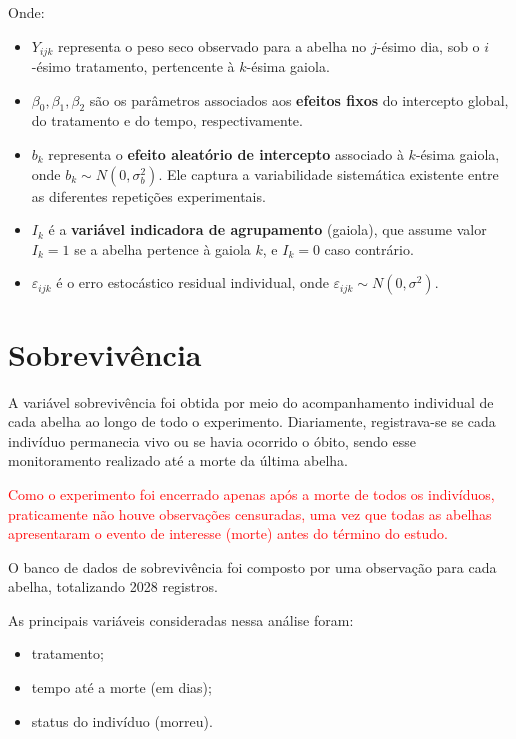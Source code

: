 \documentclass[
  brazilian,
  12pt,
  a4paper,
]{article}
\begin{document}
Onde:

\begin{itemize}
    \item $Y_{ijk}$ representa o peso seco observado para a abelha no $j$-ésimo dia, sob o $i$-ésimo tratamento, pertencente à $k$-ésima gaiola.
    \item $\beta_0, \beta_1, \beta_2$ são os parâmetros associados aos \textbf{efeitos fixos} do intercepto global, do tratamento e do tempo, respectivamente.
    \item $b_k$ representa o \textbf{efeito aleatório de intercepto} associado à $k$-ésima gaiola, onde $b_k \sim N(0, \sigma^2_b)$. Ele captura a variabilidade sistemática existente entre as diferentes repetições experimentais.
    \item $I_k$ é a \textbf{variável indicadora de agrupamento} (gaiola), que assume valor $I_k = 1$ se a abelha pertence à gaiola $k$, e $I_k = 0$ caso contrário.
    \item $\varepsilon_{ijk}$ é o erro estocástico residual individual, onde $\varepsilon_{ijk} \sim N(0, \sigma^2)$.
\end{itemize}

\section{Sobrevivência}\label{sobrevivuxeancia}

A variável sobrevivência foi obtida por meio do acompanhamento
individual de cada abelha ao longo de todo o experimento. Diariamente,
registrava-se se cada indivíduo permanecia vivo ou se havia ocorrido o
óbito, sendo esse monitoramento realizado até a morte da última abelha.

\textcolor{red}{Como o experimento foi encerrado apenas após a morte de todos os indivíduos, praticamente não houve observações censuradas, uma vez que todas as abelhas apresentaram o evento de interesse (morte) antes do término do estudo.}

O banco de dados de sobrevivência foi composto por uma observação para
cada abelha, totalizando 2028 registros.

As principais variáveis consideradas nessa análise foram:

\begin{itemize}
    \item tratamento;
    \item tempo até a morte (em dias);
    \item status do indivíduo (morreu).
\end{itemize}
\end{document}
